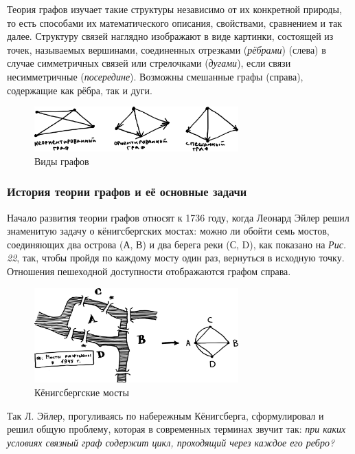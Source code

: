 \documentclass[12pt, a4paper]{article}
\begin{document}
Теория графов изучает такие структуры независимо от их конкретной природы, то есть способами их математического описания, свойствами, сравнением и так далее. Структуру связей наглядно изображают в виде картинки, состоящей из точек, называемых вершинами, соединенных отрезками (\textit{рёбрами}) (слева) в случае симметричных связей или стрелочками (\textit{дугами}), если связи несимметричные (\textit{посередине}). Возможны смешанные графы (справа), содержащие как рёбра, так и дуги.

\begin{figure}[h]
 \centering
 \includegraphics[width=0.7\textwidth]{23}
 \vspace{-4mm}
  \caption{Виды графов}
\end{figure}

\subsubsection{История теории графов и её основные задачи}

Начало развития теории графов относят к 1736 году, когда Леонард Эйлер решил знаменитую задачу о кёнигсбергских мостах: можно ли обойти семь мостов, соединяющих два острова (А, В) и два берега реки (С, D), как показано на \textit{Рис. 22}, так, чтобы пройдя по каждому мосту один раз, вернуться в исходную точку. Отношения пешеходной доступности отображаются графом справа.

\begin{figure}[h]
 \centering
 \includegraphics[width=0.7\textwidth]{24}
 \vspace{-4mm}
  \caption{Кёнигсбергские мосты}
\end{figure}

Так Л. Эйлер, прогуливаясь по набережным Кёнигсберга, сформулировал и решил общую проблему, которая в современных терминах звучит так: \textit{при каких условиях связный граф содержит цикл, проходящий через каждое его ребро?}
\end{document}
